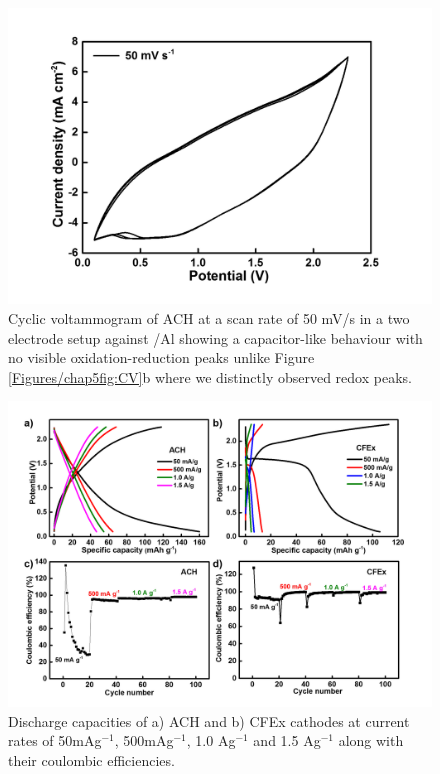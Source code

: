 \begin{figure}[h!]
\centering
\includegraphics[width=\textwidth]{Figures/chap5fig/hair50mVs}
\caption{Cyclic voltammogram of ACH at a scan rate of 50 mV/s in a two electrode setup against /Al showing a capacitor-like behaviour with no visible oxidation-reduction peaks unlike Figure \ref{Figures/chap5fig:CV}b where we distinctly observed redox peaks.}
\label{Figures/chap5fig:hair50mVs}
\end{figure}

\begin{figure}[h!]
  \centering
  \includegraphics[width=\textwidth]{Figures/chap5fig/cfexachlong}
    \caption{Discharge capacities of a) ACH and b) CFEx cathodes at current rates of 50mAg$^{-1}$, 500mAg$^{-1}$, 1.0 Ag$^{-1}$ and 1.5 Ag$^{-1}$ along with their coulombic efficiencies. }
  \label{Figures/chap5fig:cfexachlong}
\end{figure}


